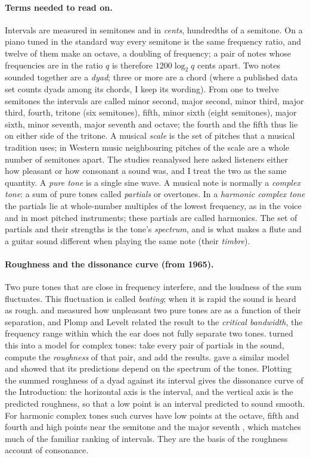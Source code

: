 \documentclass[11pt,a4paper]{article}
\begin{document}
\paragraph{Terms needed to read on.}
Intervals are measured in semitones and in \emph{cents}, hundredths
of a semitone. On a piano tuned in the standard way every semitone is the same frequency
ratio, and twelve of them make an octave, a doubling of frequency; a pair of notes whose
frequencies are in the ratio $q$ is therefore $1200\log_2 q$ cents apart. Two notes sounded together are a \emph{dyad}; three or more are a
chord (where a published data set counts dyads among its chords, I keep its wording). From
one to twelve semitones the intervals are called minor second, major second, minor third,
major third, fourth, tritone (six semitones), fifth, minor sixth (eight
semitones), major sixth, minor seventh, major seventh and octave; the fourth and the fifth
thus lie on either side of the tritone. A musical \emph{scale} is the set of pitches that a
musical tradition uses; in Western music neighbouring pitches of the scale are a whole number
of semitones apart. The studies reanalysed here asked listeners either how
pleasant or how consonant a sound was, and I treat the two as the same quantity. A \emph{pure tone} is a single sine wave. A musical note is normally a
\emph{complex tone}: a sum of pure tones called \emph{partials} or overtones. In a
\emph{harmonic complex tone} the partials lie at whole-number multiples of the lowest
frequency, as in the voice and in most pitched instruments; these partials are called
harmonics. The set of partials and their strengths is the tone's \emph{spectrum}, and is what
makes a flute and a guitar sound different when playing the same note (their \emph{timbre}).

\paragraph{Roughness and the dissonance curve (from 1965).}
Two pure tones that are close in frequency interfere, and the loudness of the sum fluctuates.
This fluctuation is called \emph{beating}; when it is rapid the sound is heard as rough.
\citet{plomp1965} and \citet{kameoka1969a} measured how unpleasant two pure tones are as a
function of their separation, and Plomp and Levelt related the result to the \emph{critical
bandwidth}, the frequency range within which the ear does not fully separate two tones.
\citet{hutchinson1978} turned this into a model for complex tones: take every pair of
partials in the sound, compute the \emph{roughness} of that pair, and add the results.
\citet{sethares1993} gave a similar model and showed that its predictions depend on the
spectrum of the tones. Plotting the summed roughness of a dyad against its interval gives the
dissonance curve of the Introduction: the horizontal axis is the interval, and the vertical axis is the
predicted roughness, so that a low point is an interval predicted to sound smooth. For
harmonic complex tones such curves have low points at the octave, fifth and fourth and high
points near the semitone and the major seventh \citep{sethares2005}, which matches much of the
familiar ranking of intervals. They are the basis of the roughness account of consonance.
\end{document}
